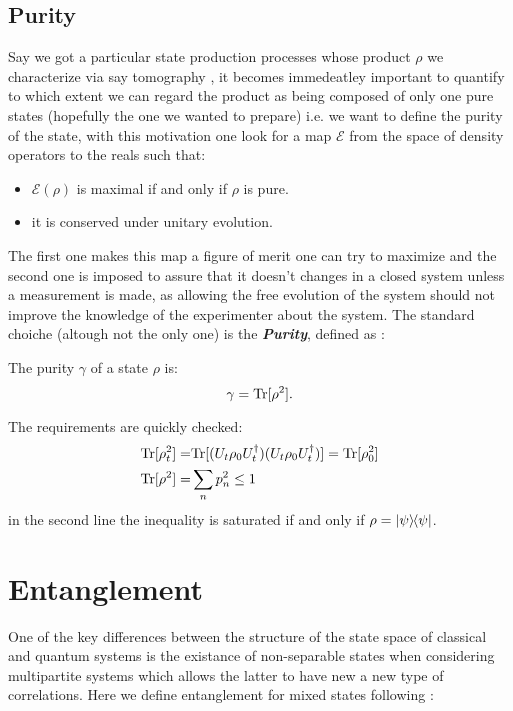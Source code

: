 \subsection{Purity}
Say we got a particular state production processes whose product $\rho$ we characterize via say tomography \cite{nielsen_quantum_2010}, it
becomes immedeatley important to quantify to which extent we can regard the product as being composed of only one pure states
(hopefully the one we wanted to prepare) i.e. we want to define the purity of the state, with this motivation one look for a map
$\mathcal{E}$ from the space of density operators to the reals such that:
\begin{itemize}
        \item $\mathcal{E}(\rho)$ is maximal if and only if $\rho$ is pure.
        \item it is conserved under unitary evolution.
\end{itemize}
The first one makes this map a figure of merit one can try to maximize and the second one is imposed to assure that it doesn't changes in a
closed system unless a measurement is made, as allowing the free evolution of the system should not improve the knowledge of the
experimenter about the system. The standard choiche (altough not the only one) is the \textit{\textbf{Purity}},
defined as \cite{nielsen_quantum_2010, ballentine_quantum_2014}:
\begin{definition}
The purity $\gamma$ of a state $\rho$ is:
  \begin{equation}
    \gamma = \mathrm{Tr}[\rho^{2}].\label{eq:definition_purity}
  \end{equation}
\end{definition}
The requirements are quickly checked:
\begin{align}
  \mathrm{Tr}[\rho^{2}_{t}] =& \mathrm{Tr}[(U_{t}\rho_{0}U_{t}^{\dagger})(U_{t}\rho_{0}U_{t}^{\dagger})] = \mathrm{Tr}[\rho_{0}^{2}]\\
  \mathrm{Tr}[\rho^{2}] =& \sum_{n}p_{n}^{2} \leq 1
\end{align}
in the second line the inequality is saturated if and only if $\rho=\ketbra{\psi}$.
\section{Entanglement}
One of the key differences between the structure of the state space of classical and quantum systems is the existance
of non-separable states when considering multipartite systems \cite{reyes-lega_aspects_2015,diosi_short_2011,nielsen_quantum_2010} which allows
the latter to have new a new type of correlations. Here we define entanglement for mixed states following \cite{diosi_short_2011}:

